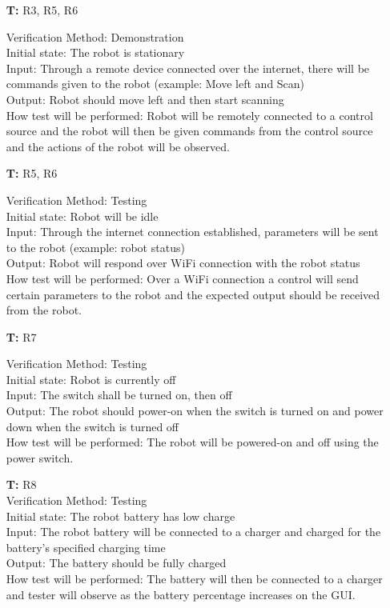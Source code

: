 \documentclass[12pt, titlepage]{article}
\newcounter{tnum} %
\begin{document}
\begin{itemize}
\item[\textbf{T\refstepcounter{tnum}\thetnum:}]{R3, R5, R6\\}

Verification Method: Demonstration\\
Initial state: The robot is stationary \\
Input: Through a remote device connected over the internet, there will be commands given to the robot (example: Move left and Scan) \\
Output: Robot should move left and then start scanning  \\
How test will be performed: Robot will be remotely connected to a control source and the robot will then be given commands from the control source and the actions of the robot will be observed. \\

\item[\textbf{T\refstepcounter{tnum}\thetnum:}]{R5, R6\\}

Verification Method: Testing\\
Initial state: Robot will be idle \\
Input: Through the internet connection established, parameters will be sent to the robot (example: robot status) \\
Output: Robot will respond over WiFi connection with the robot status  \\
How test will be performed: Over a WiFi connection a control will send certain parameters to the robot and the expected output should be received from the robot. \\

\item[\textbf{T\refstepcounter{tnum}\thetnum:}]{R7\\}

Verification Method: Testing\\
Initial state: Robot is currently off \\
Input: The switch shall be turned on, then off\\
Output: The robot should power-on when the switch is turned on and power down when the switch is turned off\\
How test will be performed: The robot will be powered-on and off using the power switch. \\

\item[\textbf{T\refstepcounter{tnum}\thetnum:}]{R8\\}
Verification Method: Testing\\
Initial state: The robot battery has low charge \\
Input: The robot battery will be connected to a charger and charged for the battery's specified charging time \\
Output: The battery should be fully charged \\
How test will be performed: The battery will then be connected to a charger and tester will observe as the battery percentage increases on the GUI.\\


\end{itemize}
\end{document}
